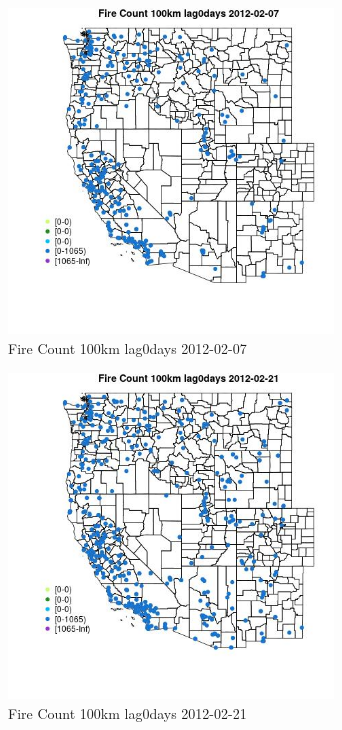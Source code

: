 \begin{figure} 
\centering  
\includegraphics[width=0.77\textwidth]{Code_Outputs/Report_ML_input_PM25_Step4_part_f_de_duplicated_aves_prioritize_24hr_obswNAs_MapObsFire_Count_100km_lag0days2012-02-07.jpg} 
\caption{\label{fig:Report_ML_input_PM25_Step4_part_f_de_duplicated_aves_prioritize_24hr_obswNAsMapObsFire_Count_100km_lag0days2012-02-07}Fire Count 100km lag0days 2012-02-07} 
\end{figure} 
 

\clearpage 

\begin{figure} 
\centering  
\includegraphics[width=0.77\textwidth]{Code_Outputs/Report_ML_input_PM25_Step4_part_f_de_duplicated_aves_prioritize_24hr_obswNAs_MapObsFire_Count_100km_lag0days2012-02-21.jpg} 
\caption{\label{fig:Report_ML_input_PM25_Step4_part_f_de_duplicated_aves_prioritize_24hr_obswNAsMapObsFire_Count_100km_lag0days2012-02-21}Fire Count 100km lag0days 2012-02-21} 
\end{figure} 
 

